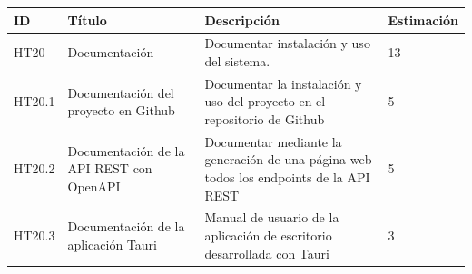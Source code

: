 \begin{table}[h!]
    \begin{center}
        \begin{tabularx}{\textwidth}{|l|X|>{\raggedright\arraybackslash}X|l|}
            \hline
            ID & Título & Descripción & Estimación \\
            \hline
            HT20 & Documentación & Documentar instalación y uso del sistema. & 13 \\
            \hline
            HT20.1 & Documentación del proyecto en Github & Documentar la instalación y uso del proyecto en el repositorio de Github & 5 \\
            \hline
            HT20.2 &  Documentación de la API REST con OpenAPI & Documentar mediante la generación de una página web todos los endpoints de la API REST & 5 \\
            \hline
            HT20.3 & Documentación de la aplicación Tauri & Manual de usuario de la aplicación de escritorio desarrollada con Tauri & 3 \\
            \hline
        \end{tabularx}
    \end{center}
\end{table}

\newpage
